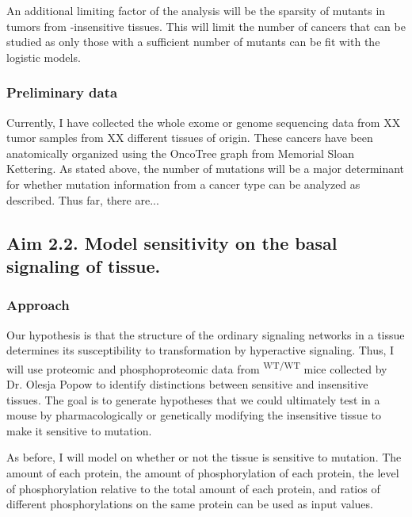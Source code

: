 An additional limiting factor of the analysis will be the sparsity of \KRAS{} mutants in tumors from \KRAS{}-insensitive tissues.
This will limit the number of cancers that can be studied as only those with a sufficient number of \KRAS{} mutants can be fit with the logistic models.

\subsubsection*{Preliminary data}

Currently, I have collected the whole exome or genome sequencing data from XX tumor samples from XX different tissues of origin.
These cancers have been anatomically organized using the OncoTree graph from Memorial Sloan Kettering.
As stated above, the number of \KRAS{} mutations will be a major determinant for whether mutation information from a cancer type can be analyzed as described.
Thus far, there are...



\subsection*{Aim 2.2. Model \KRAS{} sensitivity on the basal signaling of tissue.}

\subsubsection*{Approach}

Our hypothesis is that the structure of the ordinary signaling networks in a tissue determines its susceptibility to transformation by hyperactive \kras{} signaling.
Thus, I will use proteomic and phosphoproteomic data from \moKRAS{}\textsuperscript{WT/WT} mice collected by Dr. Olesja Popow to identify distinctions between sensitive and insensitive tissues.
The goal is to generate hypotheses that we could ultimately test in a mouse by pharmacologically or genetically modifying the insensitive tissue to make it sensitive to \KRAS{} mutation.

As before, I will model on whether or not the tissue is sensitive to \KRAS{} mutation. 
The amount of each protein, the amount of phosphorylation of each protein, the level of phosphorylation relative to the total amount of each protein, and ratios of different phosphorylations on the same protein can be used as input values.

